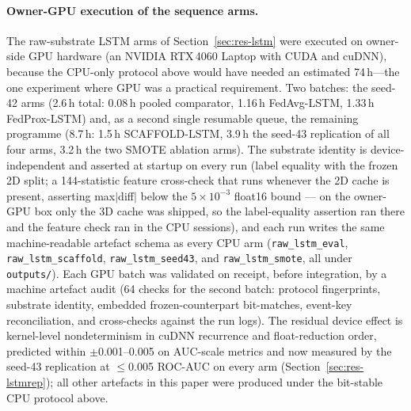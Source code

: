 \paragraph{Owner-GPU execution of the sequence arms.}
The raw-substrate LSTM arms of Section~\ref{sec:res-lstm} were
executed on owner-side GPU hardware (an NVIDIA RTX\,4060 Laptop
with CUDA and cuDNN), because the CPU-only protocol above would
have needed an estimated 74\,h---the one experiment where GPU was
a practical requirement. Two batches: the seed-42 arms (2.6\,h total: 0.08\,h
pooled comparator, 1.16\,h FedAvg-LSTM, 1.33\,h FedProx-LSTM) and,
as a second single resumable queue, the remaining programme (8.7\,h:
1.5\,h SCAFFOLD-LSTM, 3.9\,h the seed-43 replication of all four
arms, 3.2\,h the two SMOTE ablation arms). The substrate identity
is device-independent and asserted at startup on every run (label
equality with the frozen 2D split; a 144-statistic feature
cross-check that runs whenever the 2D cache is present, asserting
max$|$diff$|$ below the $5\times10^{-3}$ float16 bound --- on the
owner-GPU box only the 3D cache was shipped, so the label-equality
assertion ran there and the feature check ran in the CPU sessions),
and each run writes the same machine-readable
artefact schema as every CPU arm (\texttt{raw\_lstm\_eval},
\texttt{raw\_lstm\_scaffold}, \texttt{raw\_lstm\_seed43}, and
\texttt{raw\_lstm\_smote}, all under \texttt{outputs/}).
Each GPU batch was validated on receipt, before integration, by a
machine artefact audit (64 checks for the second batch: protocol
fingerprints, substrate identity, embedded frozen-counterpart
bit-matches, event-key reconciliation, and cross-checks against
the run logs). The residual device effect is kernel-level
nondeterminism in cuDNN recurrence and float-reduction order,
predicted within $\pm$0.001--0.005 on AUC-scale metrics and now
measured by the seed-43 replication at $\le$0.005 ROC-AUC on every
arm (Section~\ref{sec:res-lstmrep}); all other artefacts in this
paper were produced under the bit-stable CPU protocol above.

